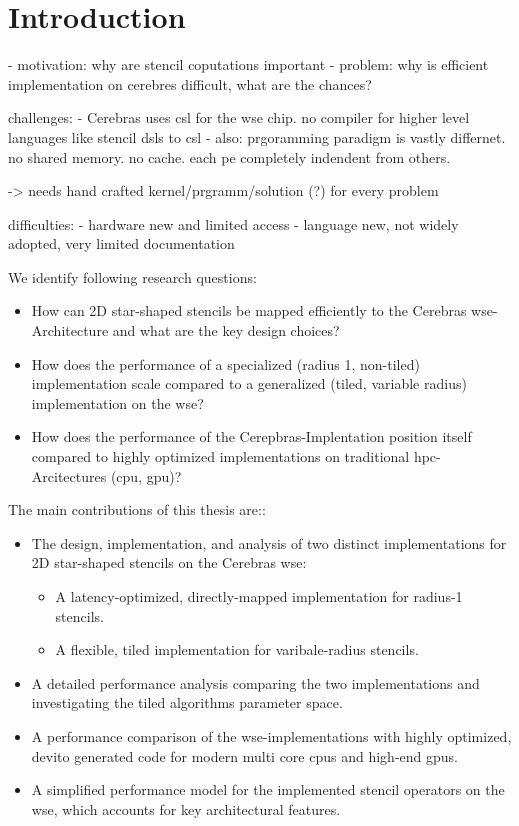 \chapter{Introduction}
- motivation: why are stencil coputations important 
- problem: why is efficient implementation on cerebres difficult, what are the chances?

challenges:
- Cerebras uses \ac{csl} for the \ac{wse} chip. no compiler for higher level languages like stencil dsls to \ac{csl}
- also: prgoramming paradigm is vastly differnet. no shared memory. no cache. each \ac{pe} completely indendent from others.

-> needs hand crafted kernel/prgramm/solution (?) for every problem

difficulties:
- hardware new and limited access
- language new, not widely adopted, very limited documentation

We identify following research questions:
\begin{itemize}
    \item How can 2D star-shaped stencils be mapped efficiently to the Cerebras \ac{wse}-Architecture and what are the key design choices?
    \item How does the performance of a specialized (radius 1, non-tiled) implementation scale compared to a generalized (tiled, variable radius) implementation on the \ac{wse}?
    \item How does the performance of the Cerepbras-Implentation position itself compared to highly optimized implementations on traditional \ac{hpc}-Arcitectures (\ac{cpu}, \ac{gpu})? 
\end{itemize}

The main contributions of this thesis are::
\begin{itemize}
    \item The design, implementation, and analysis of two distinct implementations for 2D star-shaped stencils on the Cerebras \ac{wse}:
    \begin{itemize}
        \item A latency-optimized, directly-mapped implementation for radius-1 stencils.
        \item A flexible, tiled implementation for varibale-radius stencils.
    \end{itemize}
    \item A detailed performance analysis comparing the two implementations and investigating the tiled algorithms parameter space. 
    \item A performance comparison of the \ac{wse}-implementations with highly optimized, devito generated code for modern multi core \acp{cpu} and high-end \acp{gpu}.
    \item A simplified performance model for the implemented stencil operators on the \ac{wse}, which accounts for key architectural features.
\end{itemize} 